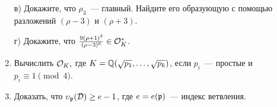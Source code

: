 \begin{example}
\begin{homework}
\begin{enumerate}
 				в) Докажите, что $\rho_3$~--- главный. Найдите его образующую с помощью разложений $(\rho - 3)$ и $(\rho + 3)$.

 				г) Докажите, что $\frac{9(\rho + 1)^3}{(\rho  - 3)^6}  \in \mathcal{O}_{K}^{*}$. 

 				\item Вычислить $\mathcal{O}_{K},$ где $K = \mathbb{Q}(\sqrt{p_1}, \ldots, \sqrt{p_k})$, если $p_i$~--- простые и $p_i \equiv 1 \pmod{4}$.
 				\item  Доказать, что $\upsilon_{\mathfrak{p}}(\mathcal{D}) \ge e - 1$, где $ e = e(\mathfrak{p})$~--- индекс ветвления. 

 			\end{enumerate}
 		\end{homework}

 		
 	\end{example}
